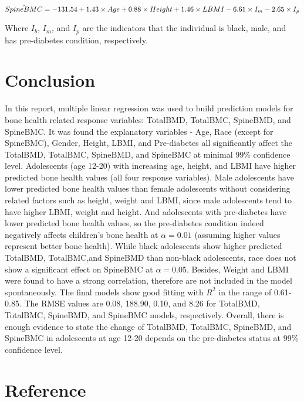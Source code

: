\documentclass[11pt]{article}
\begin{document}
\begin{equation}
\hat{SpineBMC} = -131.54 +1.43\times Age +0.88\times Height +1.46\times LBMI -6.61\times I_m -2.65\times I_p \\
\end{equation}

Where $I_b$, $I_m$, and $I_p$ are the indicators that the individual is black, male, and has pre-diabetes condition, respectively.



			
\section{Conclusion}
In this report, multiple linear regression was used to build prediction models for bone health related response variables: TotalBMD, TotalBMC, SpineBMD, and SpineBMC. It was found the explanatory variables - Age, Race (except for SpineBMC), Gender, Height, LBMI, and  Pre-diabetes all significantly affect the TotalBMD, TotalBMC, SpineBMD, and SpineBMC at minimal 99\% confidence level. Adolescents (age 12-20) with increasing age, height, and LBMI have higher predicted bone health values (all four response variables). Male adolescents have lower predicted bone health values than female adolescents without considering related factors such as height, weight and LBMI, since male adolescents tend to have higher LBMI, weight and height. And adolescents with pre-diabetes have lower predicted bone health values, so the pre-diabetes condition indeed negatively affects children's bone health at $\alpha=0.01$ (assuming higher values represent better bone health). While black adolescents show higher predicted TotalBMD, TotalBMC,and SpineBMD than non-black adolescents, race does not show a significant effect on SpineBMC at $\alpha=0.05$. 
Besides, Weight and LBMI were found to have a strong correlation, therefore are not included in the model spontaneously. The final models show good fitting with $R^2$ in the range of 0.61-0.85. The RMSE values are 0.08, 188.90, 0.10, and 8.26 for TotalBMD, TotalBMC, SpineBMD, and SpineBMC models, respectively. Overall, there is enough evidence to state the change of TotalBMD, TotalBMC, SpineBMD, and SpineBMC in adolescents at age 12-20 depends on the pre-diabetes status at 99\% confidence level.

\newpage

\section*{Reference}
\end{document}
